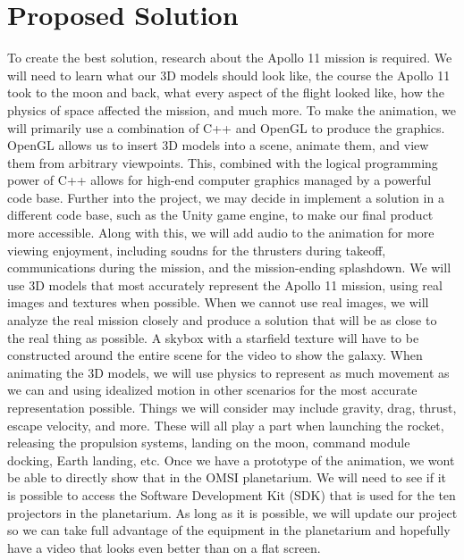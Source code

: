 \documentclass[onecolumn, draftclsnofoot,10pt, compsoc]{IEEEtran}
\begin{document}
\section{Proposed Solution}
To create the best solution, research about the Apollo 11 mission is required. We will need to learn what our 3D models should look like, the course the Apollo 11 took to the moon and back, what every aspect of the flight looked like, how the physics of space affected the mission, and much more. To make the animation, we will primarily use a combination of C++ and OpenGL to produce the graphics. OpenGL allows us to insert 3D models into a scene, animate them, and view them from arbitrary viewpoints. This, combined with the logical programming power of C++ allows for high-end computer graphics managed by a powerful code base. Further into the project, we may decide in implement a solution in a different code base, such as the Unity game engine, to make our final product more accessible. Along with this, we will add audio to the animation for more viewing enjoyment, including soudns for the thrusters during takeoff, communications during the mission, and the mission-ending splashdown.
\newline
\newline
We will use 3D models that most accurately represent the Apollo 11 mission, using real images and textures when possible. When we cannot use real images, we will analyze the real mission closely and produce a solution that will be as close to the real thing as possible. A skybox with a starfield texture will have to be constructed around the entire scene for the video to show the galaxy. When animating the 3D models, we will use physics to represent as much movement as we can and using idealized motion in other scenarios for the most accurate representation possible. Things we will consider may include gravity, drag, thrust, escape velocity, and more. These will all play a part when launching the rocket, releasing the propulsion systems, landing on the moon, command module docking, Earth landing, etc. Once we have a prototype of the animation, we wont be able to directly show that in the OMSI planetarium. We will need to see if it is possible to access the Software Development Kit (SDK) that is used for the ten projectors in the planetarium. As long as it is possible, we will update our project so we can take full advantage of the equipment in the planetarium and hopefully have a video that looks even better than on a flat screen. 
\end{document}
